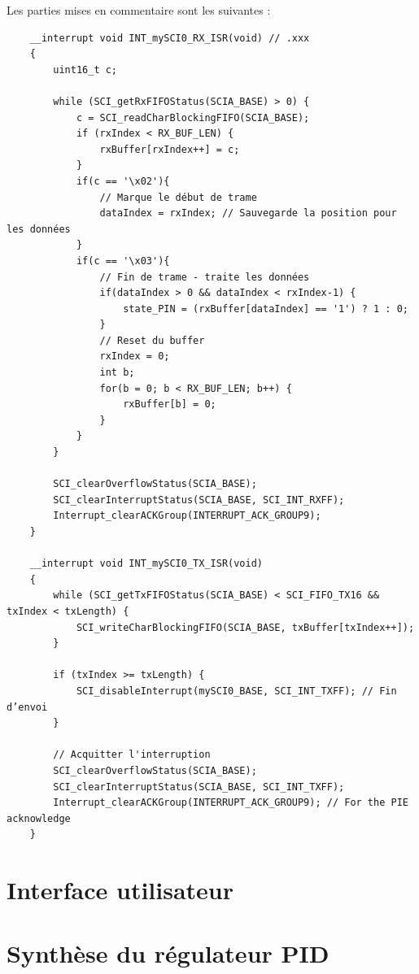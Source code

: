 Les parties mises en commentaire sont les suivantes :

\begin{verbatim}
    __interrupt void INT_mySCI0_RX_ISR(void) // .xxx
    {
        uint16_t c;

        while (SCI_getRxFIFOStatus(SCIA_BASE) > 0) {
            c = SCI_readCharBlockingFIFO(SCIA_BASE);
            if (rxIndex < RX_BUF_LEN) {
                rxBuffer[rxIndex++] = c;
            }
            if(c == '\x02'){
                // Marque le début de trame
                dataIndex = rxIndex; // Sauvegarde la position pour les données
            }
            if(c == '\x03'){
                // Fin de trame - traite les données
                if(dataIndex > 0 && dataIndex < rxIndex-1) {
                    state_PIN = (rxBuffer[dataIndex] == '1') ? 1 : 0;
                }
                // Reset du buffer
                rxIndex = 0;
                int b;
                for(b = 0; b < RX_BUF_LEN; b++) {
                    rxBuffer[b] = 0;
                }
            }
        }

        SCI_clearOverflowStatus(SCIA_BASE);
        SCI_clearInterruptStatus(SCIA_BASE, SCI_INT_RXFF);
        Interrupt_clearACKGroup(INTERRUPT_ACK_GROUP9);
    }

    __interrupt void INT_mySCI0_TX_ISR(void)
    {
        while (SCI_getTxFIFOStatus(SCIA_BASE) < SCI_FIFO_TX16 && txIndex < txLength) {
            SCI_writeCharBlockingFIFO(SCIA_BASE, txBuffer[txIndex++]);
        }

        if (txIndex >= txLength) {
            SCI_disableInterrupt(mySCI0_BASE, SCI_INT_TXFF); // Fin d’envoi
        }

        // Acquitter l'interruption
        SCI_clearOverflowStatus(SCIA_BASE);
        SCI_clearInterruptStatus(SCIA_BASE, SCI_INT_TXFF);
        Interrupt_clearACKGroup(INTERRUPT_ACK_GROUP9); // For the PIE acknowledge
    }
\end{verbatim}

\section{Interface utilisateur}

\section{Synthèse du régulateur PID}
